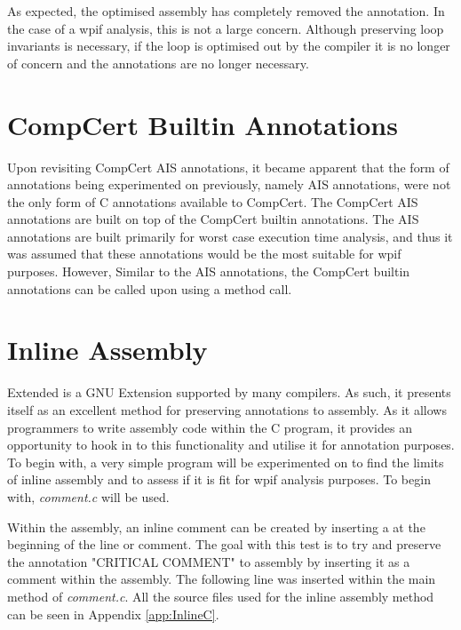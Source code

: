 

As expected, the optimised assembly has completely removed the annotation. In the case of a wpif analysis, this is not a large concern. Although preserving loop invariants is necessary, if the loop is optimised out by the compiler it is no longer of concern and the annotations are no longer necessary.


\section{CompCert Builtin Annotations}

Upon revisiting CompCert AIS annotations, it became apparent that the form of annotations being experimented on previously, namely AIS annotations, were not the only form of C annotations available to CompCert. The CompCert AIS annotations are built on top of the CompCert builtin annotations. The AIS annotations are built primarily for worst case execution time analysis, and thus it was assumed that these annotations would be the most suitable for wpif purposes. However,  Similar to the AIS annotations, the CompCert builtin annotations can be called upon using a method call.


\section{Inline Assembly}
\label{sec:inlineAssembly}

Extended  is a GNU Extension supported by many compilers. As such, it presents itself as an excellent method for preserving annotations to assembly. As it allows programmers to write assembly code within the C program, it provides an opportunity to hook in to this functionality and utilise it for annotation purposes. To begin with, a very simple program will be experimented on to find the limits of inline assembly and to assess if it is fit for wpif analysis purposes. To begin with, \textit{comment.c} will be used.

Within the assembly, an inline comment can be created by inserting a \code{\#} at the beginning of the line or comment. The goal with this test is to try and preserve the annotation "CRITICAL COMMENT" to assembly by inserting it as a comment within the assembly. The following line was inserted within the main method of \textit{comment.c}. All the source files used for the inline assembly method can be seen in Appendix \ref{app:InlineC}.

